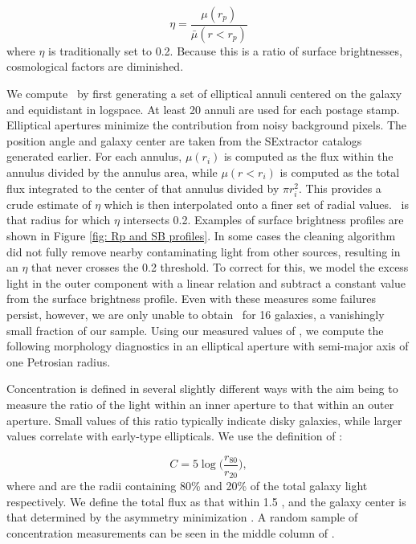 \begin{equation}\label{fig: petrosian raidus}
\eta = \frac{\mu(r_p)}{\bar\mu(r<r_p)}
\end{equation}
where $\eta$ is traditionally set to 0.2. Because this is a ratio of surface brightnesses, cosmological factors are diminished. 

We compute \rp~by first generating a set of elliptical annuli centered on the galaxy and equidistant in logspace. At least 20 annuli are used for each postage stamp. Elliptical apertures minimize the contribution from noisy background pixels. The position angle and galaxy center are taken from the SExtractor catalogs generated earlier. For each annulus, $\mu(r_i)$ is computed as the flux within the annulus divided by the annulus area, while $\mu(r<r_i)$ is computed as the total flux integrated to the center of that annulus divided by $\pi r_i^2$. This provides a crude estimate of $\eta$ which is then interpolated onto a finer set of radial values.  \rp~is that radius for which $\eta$ intersects 0.2. Examples of surface brightness profiles are shown in Figure \ref{fig: Rp and SB profiles}. In some cases the cleaning algorithm did not fully remove nearby contaminating light from other sources, resulting in an $\eta$ that never crosses the 0.2 threshold. To correct for this, we model the excess light in the outer component with a linear relation and subtract a constant value from the surface brightness profile. Even with these measures some failures persist, however, we are only unable to obtain \rp~for 16 galaxies, a vanishingly small fraction of our sample. Using our measured values of \rp, we compute the following morphology diagnostics in an elliptical aperture with semi-major axis of one Petrosian radius. 


Concentration is defined in several slightly different ways with the aim being to measure the ratio of the light within an inner aperture to that within an outer aperture. Small values of this ratio typically indicate disky galaxies, while larger values correlate with early-type ellipticals. We use the definition of \cite{Bershady2000}:

\begin{equation}\label{eqn: concentration}
C = 5\log\Big(\frac{r_{80}}{r_{20}}\Big), 
\end{equation}
where  and  are the radii containing 80\% and 20\% of the total galaxy light respectively. We define the total flux as that within 1.5 \rp, and the galaxy center is that determined by the asymmetry minimization \cite[described below,][]{Lotz2004}. A random sample of concentration measurements can be seen in the middle column of . 

